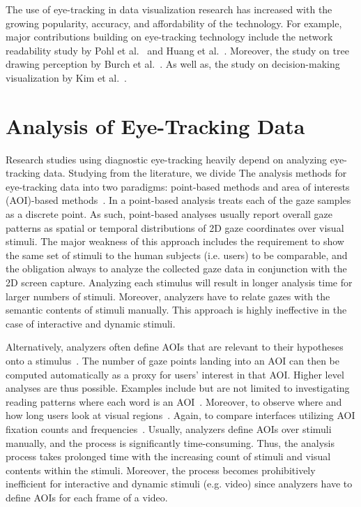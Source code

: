 The use of eye-tracking in data visualization research has increased with the growing popularity, accuracy, and affordability of the technology. For example, major contributions building on eye-tracking technology include the network readability study by Pohl et al.~\cite{Poh09} and Huang et al.~\cite{Hua08, Hua05}. Moreover, the study on tree drawing perception by Burch et al.~\cite{Bur11, Bur13}. As well as, the study on decision-making visualization by Kim et al.~\cite{Kim12}.

\section{Analysis of Eye-Tracking Data}
Research studies using diagnostic eye-tracking heavily depend on analyzing eye-tracking data. Studying from the literature, we divide The analysis methods for eye-tracking data into two paradigms: point-based methods and area of interests (AOI)-based methods~\cite{Bla14}. In a point-based analysis treats each of the gaze samples as a discrete point. As such, point-based analyses usually report overall gaze patterns as spatial or temporal distributions of 2D gaze coordinates over visual stimuli. The major weakness of this approach includes the requirement to show the same set of stimuli to the human subjects (i.e. users) to be comparable, and the obligation always to analyze the collected gaze data in conjunction with the 2D screen capture. Analyzing each stimulus will result in longer analysis time for larger numbers of stimuli. Moreover, analyzers have to relate gazes with the semantic contents of stimuli manually. This approach is highly ineffective in the case of interactive and dynamic stimuli.

Alternatively, analyzers often define AOIs that are relevant to their hypotheses onto a stimulus~\cite{Bla14}. The number of gaze points landing into an AOI can then be computed automatically as a proxy for users' interest in that AOI. Higher level analyses are thus possible. Examples include but are not limited to investigating reading patterns where each word is an AOI~\cite{Bey05, San04}. Moreover, to observe where and how long users look at visual regions~\cite{Coco09, Kim12}. Again, to compare interfaces utilizing AOI fixation counts and frequencies~\cite{Coletkin09}. Usually, analyzers define AOIs over stimuli manually, and the process is significantly time-consuming. Thus, the analysis process takes prolonged time with the increasing count of stimuli and visual contents within the stimuli. Moreover, the process becomes prohibitively inefficient for interactive and dynamic stimuli (e.g. video) since analyzers have to define AOIs for each frame of a video.    
  
